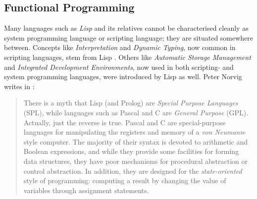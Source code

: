 %
%
%
%
%
%
%

\subsection{Functional Programming}
\label{functional_programming_heading}

Many languages such as \emph{Lisp} and its relatives cannot be characterised
cleanly as system programming language or scripting language; they are situated
somewhere between. Concepts like \emph{Interpretation} and \emph{Dynamic Typing},
now common in scripting languages, stem from Lisp \cite{ousterhout1998}. Others like
\emph{Automatic Storage Management} and \emph{Integrated Development Environments},
now used in both scripting- and system programming languages, were introduced by
Lisp as well. Peter Norvig writes in \cite{norvig}:

\begin{quote}
    There is a myth that Lisp (and Prolog) are \emph{Special Purpose Languages}
    (SPL), while languages such as Pascal and C are \emph{General Purpose} (GPL).
    Actually, just the reverse is true. Pascal and C are special-purpose languages
    for manipulating the registers and memory of a \emph{von Neumann}-style computer.
    The majority of their syntax is devoted to arithmetic and Boolean expressions,
    and while they provide some facilities for forming data structures, they have
    poor mechanisms for procedural abstraction or control abstraction. In addition,
    they are designed for the \emph{state-oriented} style of programming: computing
    a result by changing the value of variables through assignment statements.
\end{quote}

